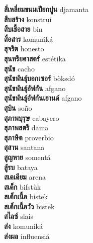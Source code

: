 \textbf{ สี่เหลี่ยมขนมเปียกปูน  } djamanta \\
\textbf{ สืบสร้าง  } konstruí \\
\textbf{ สืบเชื้อสาย  } bin \\
\textbf{ สื่อสาร  } komuniká \\
\textbf{ สุจริต  } honesto \\
\textbf{ สุนทรียศาสตร์  } estétika \\
\textbf{ สุนัข  } cacho \\
\textbf{ สุนัขพันธุ์บอกเซอร์  } bòksdó \\
\textbf{ สุนัขพันธุ์อัฟกัน  } afgano \\
\textbf{ สุนัขพันธุ์อัฟกันเฮานด์  } afgano \\
\textbf{ สุบิน  } soño \\
\textbf{ สุภาพบุรุษ  } cabayero \\
\textbf{ สุภาพสตรี  } dama \\
\textbf{ สุภาษิต  } proverbio \\
\textbf{ สุสาน  } santana \\
\textbf{ สูญหาย  } somentá \\
\textbf{ สู้รบ  } bataya \\
\textbf{ สเตเดียม  } arena \\
\textbf{ สเต็ก  } bifstùk \\
\textbf{ สเต็กเนื้อ  } bistek \\
\textbf{ สเต็กเนื้อวัว  } bistek \\
\textbf{ สไลซ์  } slais \\
\textbf{ ส่ง  } komuniká \\
\textbf{ ส่งผล  } influensiá \\
